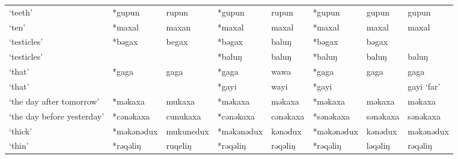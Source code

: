 \begin{landscape}
\begin{longtable}[c]{@{}p{3cm}<{\raggedright}p{2.75cm}<{\raggedright}p{2.75cm}<{\raggedright}p{2.75cm}<{\raggedright}p{2.75cm}<{\raggedright}p{2.75cm}<{\raggedright}p{2.75cm}<{\raggedright}p{2.75cm}<{\raggedright}@{}}
`teeth'                                              & *gupun             & rupun                          & *gupun             & rupun                      & *gupun           & gupun                    & gupun                             \\
`ten'                                                & *maxal             & maxan                          & *maxal             & maxal                      & *maxal           & maxal                    & maxal                             \\
`testicles'                                          & *bəgax             & begax                          & *bəgax             & baluŋ                      & *bəgax           & bəgax                    &                                   \\
`testicles'                                          &                    &                                & *baluŋ             & baluŋ                      & *baluŋ           & baluŋ                    & baluŋ                             \\
`that'                                               & *gaga              & gaga                           & *gaga              & wawa                       & *gaga            & gaga                     & gaga                              \\
`that'                                               &                    &                                & *gayi              & wayi                        & *gayi            &                          & gayi `far'                        \\
`the day after tomorrow'                             & *məkaxa            & mukaxa                         & *məkaxa            & məkaxa                     & *məkaxa          & məkaxa                   & məkaxa                            \\
`the day before yesterday'                           & *cənəkaxa          & cunukaxa                       & *cənəkaxa          & cənəkaxa                   & *sənəkaxa        & sənəkaxa                 & sənəkaxa                          \\
`thick'                                              & *məkənədux         & mukunedux                      & *məkənədux         & kənədux                    & *məkənədux       & kənədux                  & məkənədux                         \\
`thin'                                               & *rəqəliŋ           & ruqeliŋ                        & *rəqəliŋ           & rəqəliŋ                    & *rəqəliŋ         & ləqəliŋ                  & rəqəliŋ                           \\

\end{longtable}
\end{landscape}
